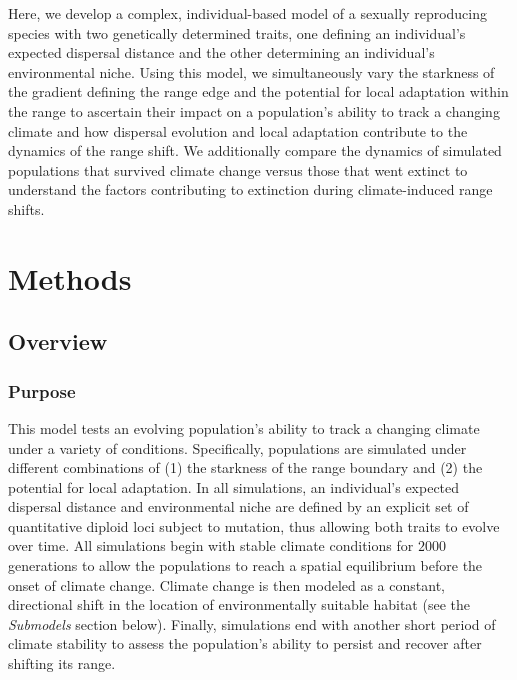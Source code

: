 \documentclass[11pt, oneside]{article}
\begin{document}
Here, we develop a complex, individual-based model of a sexually reproducing species with two genetically determined traits, one defining an individual's expected dispersal distance and the other determining an individual's environmental niche. Using this model, we simultaneously vary the starkness of the gradient defining the range edge and the potential for local adaptation within the range to ascertain their impact on a population's ability to track a changing climate and how dispersal evolution and local adaptation contribute to the dynamics of the range shift. We additionally compare the dynamics of simulated populations that survived climate change versus those that went extinct to understand the factors contributing to extinction during climate-induced range shifts.  

\section{Methods}
\subsection{Overview}
\subsubsection{Purpose}
This model tests an evolving population's ability to track a changing climate under a variety of conditions. Specifically, populations are simulated under different combinations of (1) the starkness of the range boundary and (2) the potential for local adaptation. In all simulations, an individual's expected dispersal distance and environmental niche are defined by an explicit set of quantitative diploid loci subject to mutation, thus allowing both traits to evolve over time. All simulations begin with stable climate conditions for $2000$ generations to allow the populations to reach a spatial equilibrium before the onset of climate change. Climate change is then modeled as a constant, directional shift in the location of environmentally suitable habitat (see the \textit{Submodels} section below). Finally, simulations end with another short period of climate stability to assess the population's ability to persist and recover after shifting its range.
\end{document}

